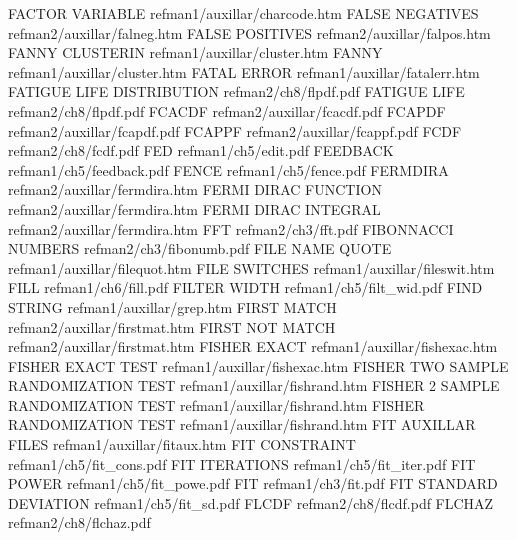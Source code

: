 FACTOR VARIABLE                         refman1/auxillar/charcode.htm
FALSE NEGATIVES                         refman2/auxillar/falneg.htm
FALSE POSITIVES                         refman2/auxillar/falpos.htm
FANNY CLUSTERIN                         refman1/auxillar/cluster.htm
FANNY                                   refman1/auxillar/cluster.htm
FATAL ERROR                             refman1/auxillar/fatalerr.htm
FATIGUE LIFE DISTRIBUTION               refman2/ch8/flpdf.pdf
FATIGUE LIFE                            refman2/ch8/flpdf.pdf
FCACDF                                  refman2/auxillar/fcacdf.pdf
FCAPDF                                  refman2/auxillar/fcapdf.pdf
FCAPPF                                  refman2/auxillar/fcappf.pdf
FCDF                                    refman2/ch8/fcdf.pdf
FED                                     refman1/ch5/edit.pdf
FEEDBACK                                refman1/ch5/feedback.pdf
FENCE                                   refman1/ch5/fence.pdf
FERMDIRA                                refman2/auxillar/fermdira.htm
FERMI DIRAC FUNCTION                    refman2/auxillar/fermdira.htm
FERMI DIRAC INTEGRAL                    refman2/auxillar/fermdira.htm
FFT                                     refman2/ch3/fft.pdf
FIBONNACCI NUMBERS                      refman2/ch3/fibonumb.pdf
FILE NAME QUOTE                         refman1/auxillar/filequot.htm
FILE SWITCHES                           refman1/auxillar/fileswit.htm
FILL                                    refman1/ch6/fill.pdf
FILTER WIDTH                            refman1/ch5/filt_wid.pdf
FIND STRING                             refman1/auxillar/grep.htm
FIRST MATCH                             refman2/auxillar/firstmat.htm
FIRST NOT MATCH                         refman2/auxillar/firstmat.htm
FISHER EXACT                            refman1/auxillar/fishexac.htm
FISHER EXACT TEST                       refman1/auxillar/fishexac.htm
FISHER TWO SAMPLE RANDOMIZATION TEST    refman1/auxillar/fishrand.htm
FISHER 2 SAMPLE RANDOMIZATION TEST      refman1/auxillar/fishrand.htm
FISHER RANDOMIZATION TEST               refman1/auxillar/fishrand.htm
FIT AUXILLAR FILES                      refman1/auxillar/fitaux.htm
FIT CONSTRAINT                          refman1/ch5/fit_cons.pdf
FIT ITERATIONS                          refman1/ch5/fit_iter.pdf
FIT POWER                               refman1/ch5/fit_powe.pdf
FIT                                     refman1/ch3/fit.pdf
FIT STANDARD DEVIATION                  refman1/ch5/fit_sd.pdf
FLCDF                                   refman2/ch8/flcdf.pdf
FLCHAZ                                  refman2/ch8/flchaz.pdf
